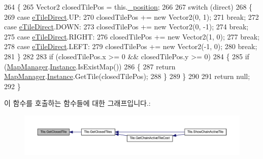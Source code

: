 \begin{DoxyCode}
264     \{
265         Vector2 closedTilePos = this.\hyperlink{class_tile_a56d02616cede51da0afdceff82ca958d}{\_position};
266 
267         \textcolor{keywordflow}{switch} (direct)
268         \{
269             \textcolor{keywordflow}{case} \hyperlink{_tile_8cs_a082f743a62d2d8e13dac8fd38af246d7}{eTileDirect}.UP:
270                 closedTilePos += \textcolor{keyword}{new} Vector2(0, 1);
271                 \textcolor{keywordflow}{break};
272             \textcolor{keywordflow}{case} \hyperlink{_tile_8cs_a082f743a62d2d8e13dac8fd38af246d7}{eTileDirect}.DOWN:
273                 closedTilePos += \textcolor{keyword}{new} Vector2(0, -1);
274                 \textcolor{keywordflow}{break};
275             \textcolor{keywordflow}{case} \hyperlink{_tile_8cs_a082f743a62d2d8e13dac8fd38af246d7}{eTileDirect}.RIGHT:
276                 closedTilePos += \textcolor{keyword}{new} Vector2(1, 0);
277                 \textcolor{keywordflow}{break};
278             \textcolor{keywordflow}{case} \hyperlink{_tile_8cs_a082f743a62d2d8e13dac8fd38af246d7}{eTileDirect}.LEFT:
279                 closedTilePos += \textcolor{keyword}{new} Vector2(-1, 0);
280                 \textcolor{keywordflow}{break};
281         \}
282 
283         \textcolor{keywordflow}{if} (closedTilePos.x >= 0 && closedTilePos.y >= 0)
284         \{
285             \textcolor{keywordflow}{if} (\hyperlink{class_map_manager}{MapManager}.\hyperlink{class_m_c_n_1_1_mono_singletone_aa50c027cca64cf4ad30c1ee5c83e0b78}{Instance}.IsExistMap())
286             \{
287                 \textcolor{keywordflow}{return} \hyperlink{class_map_manager}{MapManager}.\hyperlink{class_m_c_n_1_1_mono_singletone_aa50c027cca64cf4ad30c1ee5c83e0b78}{Instance}.GetTile(closedTilePos);
288             \}
289         \}
290 
291         \textcolor{keywordflow}{return} null;
292     \}
\end{DoxyCode}


이 함수를 호출하는 함수들에 대한 그래프입니다.\+:\nopagebreak
\begin{figure}[H]
\begin{center}
\leavevmode
\includegraphics[width=350pt]{class_tile_a838aaa6a94321629d04e944ed3bf8b9f_icgraph}
\end{center}
\end{figure}


